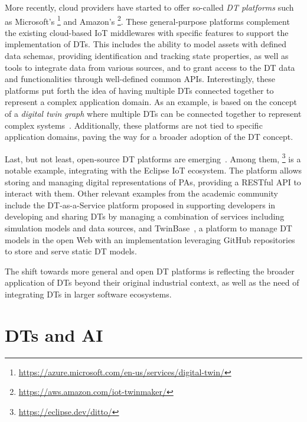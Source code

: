 More recently, cloud providers have started to offer so-called \emph{\ac{DT} platforms} such as Microsoft's \azureTwin{}\footnote{\url{https://azure.microsoft.com/en-us/services/digital-twin/}} and Amazon's \awsTwin{}\footnote{\url{https://aws.amazon.com/iot-twinmaker/}}.
%
These general-purpose platforms complement the existing cloud-based \ac{IoT} middlewares with specific features to support the implementation of \acp{DT}. 
This includes the ability to model assets with defined data schemas, providing identification and tracking state properties,
as well as tools to integrate data from various sources, and to grant access to the \ac{DT} data and functionalities through well-defined common \acp{API}.
%
Interestingly, these platforms put forth the idea of having multiple \acp{DT} connected together to represent a complex application domain. 
%
As an example, \azureTwin{} is based on the concept of a \emph{digital twin graph} where multiple \acp{DT} can be connected together to represent complex systems~\cite{Meijers_2022}.
%
Additionally, these platforms are not tied to specific application domains, paving the way for a broader adoption of the \ac{DT} concept. 

Last, but not least, open-source \ac{DT} platforms are emerging~\cite{Gil_Mikkelsen_Gomes_Larsen_2024}.
Among them, \ditto{}\footnote{\url{https://eclipse.dev/ditto/}} is a notable example, integrating with the Eclipse \ac{IoT} ecosystem. 
%
The platform allows storing and managing digital representations of \acp{PA}, providing a RESTful \ac{API} to interact with them. 
%
Other relevant examples from the academic community include
the \ac{DT}-as-a-Service platform proposed in \cite{Talasila_Gomes_Mikkelsen_Arboleda_Kamburjan_Larsen_2023} supporting developers in developing and sharing \acp{DT} by managing a combination of services including simulation models and data sources,
and TwinBase~\cite{Autiosalo_Siegel_Tammi_2021}, a platform to manage \ac{DT} models in the open Web with an implementation leveraging GitHub repositories to store and serve static \ac{DT} models.

The shift towards more general and open \ac{DT} platforms is reflecting the broader application of \acp{DT} beyond their original industrial context, as well as the need of integrating \acp{DT} in larger software ecosystems.

\section{\aclp{DT} and \acl{AI}}
\label{sec:back:dt:ai}

